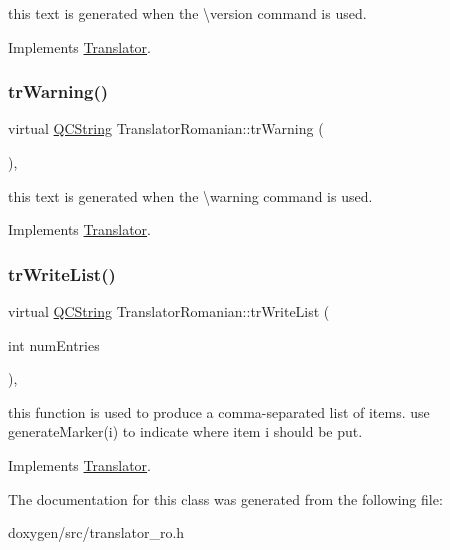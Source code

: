 this text is generated when the \textbackslash{}version command is used. 

Implements \mbox{\hyperlink{class_translator}{Translator}}.

\mbox{\label{class_translator_romanian_a279ad6652742f75406aa0e0d5d252a57}} 
\subsubsection{\texorpdfstring{trWarning()}{trWarning()}}
{\footnotesize\ttfamily virtual \mbox{\hyperlink{class_q_c_string}{Q\+C\+String}} Translator\+Romanian\+::tr\+Warning (\begin{DoxyParamCaption}{ }\end{DoxyParamCaption})\hspace{0.3cm}{\ttfamily [inline]}, {\ttfamily [virtual]}}

this text is generated when the \textbackslash{}warning command is used. 

Implements \mbox{\hyperlink{class_translator}{Translator}}.

\mbox{\label{class_translator_romanian_a5858c6cb6e24f1edf66b667e356d5caf}} 
\subsubsection{\texorpdfstring{trWriteList()}{trWriteList()}}
{\footnotesize\ttfamily virtual \mbox{\hyperlink{class_q_c_string}{Q\+C\+String}} Translator\+Romanian\+::tr\+Write\+List (\begin{DoxyParamCaption}\item[{int}]{num\+Entries }\end{DoxyParamCaption})\hspace{0.3cm}{\ttfamily [inline]}, {\ttfamily [virtual]}}

this function is used to produce a comma-\/separated list of items. use generate\+Marker(i) to indicate where item i should be put. 

Implements \mbox{\hyperlink{class_translator}{Translator}}.



The documentation for this class was generated from the following file\+:\begin{DoxyCompactItemize}
\item 
doxygen/src/translator\+\_\+ro.\+h\end{DoxyCompactItemize}
